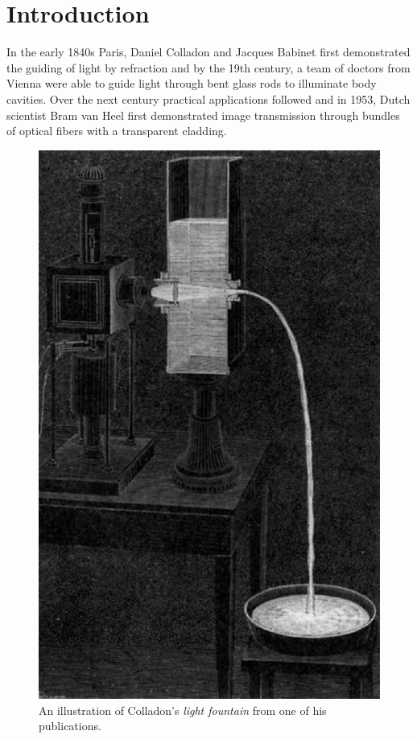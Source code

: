 \documentclass[%
 reprint,
nofootinbib,
 amsmath,amssymb,
 aps,
]{revtex4-2}
\begin{document}
\maketitle


\section{Introduction}


In the early 1840s Paris, Daniel Colladon and Jacques Babinet first demonstrated the guiding of light by refraction and by the 19th century, a team of doctors from Vienna were able to guide light through bent glass rods to illuminate body cavities. Over the next century practical applications followed and in 1953, Dutch scientist Bram van Heel first demonstrated image transmission through bundles of optical fibers with a transparent cladding. 


\begin{figure}
	\centering
	\includegraphics[scale = 0.65]{colladon}
	\caption{An illustration of Colladon's \textit{light fountain} from one of his publications.}
\end{figure}
\end{document}
